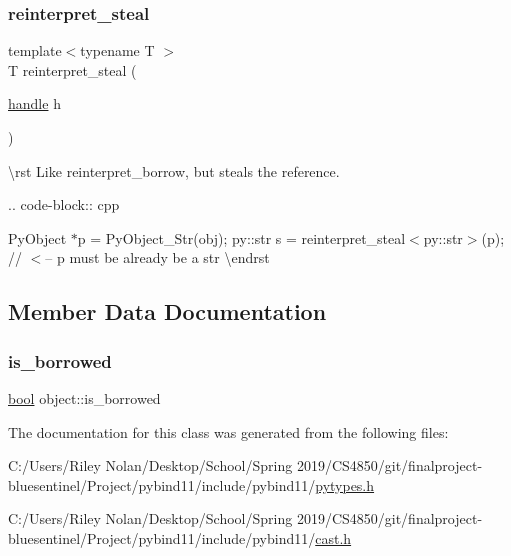 \subsubsection{\texorpdfstring{reinterpret\_steal}{reinterpret\_steal}}
{\footnotesize\ttfamily template$<$typename T $>$ \\
T reinterpret\+\_\+steal (\begin{DoxyParamCaption}\item[{\mbox{\hyperlink{classhandle}{handle}}}]{h }\end{DoxyParamCaption})\hspace{0.3cm}{\ttfamily [friend]}}

\textbackslash{}rst Like {\ttfamily reinterpret\+\_\+borrow}, but steals the reference.

.. code-\/block\+:: cpp

Py\+Object $\ast$p = Py\+Object\+\_\+\+Str(obj); py\+::str s = reinterpret\+\_\+steal$<$py\+::str$>$(p); // $<$-- {\ttfamily p} must be already be a {\ttfamily str} \textbackslash{}endrst 

\subsection{Member Data Documentation}
\mbox{\label{classobject_a4ebda2f2d08435f4d70d822908d7e431}} 
\subsubsection{\texorpdfstring{is\_borrowed}{is\_borrowed}}
{\footnotesize\ttfamily \mbox{\hyperlink{asdl_8h_af6a258d8f3ee5206d682d799316314b1}{bool}} object\+::is\+\_\+borrowed}



The documentation for this class was generated from the following files\+:\begin{DoxyCompactItemize}
\item 
C\+:/\+Users/\+Riley Nolan/\+Desktop/\+School/\+Spring 2019/\+C\+S4850/git/finalproject-\/bluesentinel/\+Project/pybind11/include/pybind11/\mbox{\hyperlink{pytypes_8h}{pytypes.\+h}}\item 
C\+:/\+Users/\+Riley Nolan/\+Desktop/\+School/\+Spring 2019/\+C\+S4850/git/finalproject-\/bluesentinel/\+Project/pybind11/include/pybind11/\mbox{\hyperlink{cast_8h}{cast.\+h}}\end{DoxyCompactItemize}
